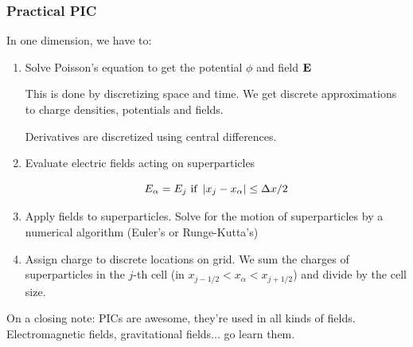\subsubsection{Practical PIC}
In one dimension, we have to:
\begin{enumerate}
\item Solve Poisson's equation to get the potential $\phi$ and field $\mathbf{E}$

This is done by discretizing space and time. We get discrete approximations to charge densities, potentials and fields.

Derivatives are discretized using central differences. 
\item Evaluate electric fields acting on superparticles

\[E_{\alpha} = E_j \text{ if } \left| x_j-x_{\alpha} \right| \leq \Delta x/2 \]

\item Apply fields to superparticles. Solve for the motion of superparticles by a numerical algorithm (Euler's or Runge-Kutta's)
\item Assign charge to discrete locations on grid. We sum the charges of superparticles in the $j$-th cell (in $x_{j-1/2} < x_{\alpha} < x_{j+1/2}$) and divide by the cell size.
\end{enumerate}


On a closing note: PICs are awesome, they're used in all kinds of fields. Electromagnetic fields, gravitational fields... go learn them. \text{:)}
